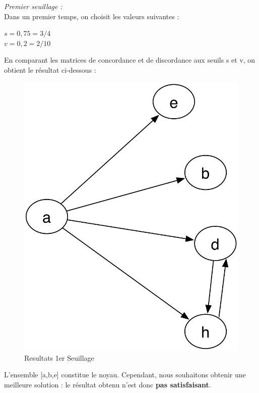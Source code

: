 \documentclass[a4paper, 11pt]{article}
\begin{document}
\emph{Premier seuillage :}\\
Dans un premier temps, on choisit les valeurs suivantes : 
\begin{center}
\textbf{$s = 0,75 = 3/4$\\
$v= 0,2 = 2/10$}
\end{center}
En comparant les matrices de concordance et de discordance aux seuils s et v, on obtient le résultat ci-dessous :\\
\begin{figure}[H]
   \begin{center}
        \includegraphics[scale=0.30]{../CR/src/Mimi/2eme.png}
        \caption{
           \label{fig} Resultats 1er Seuillage
        }
    \end{center}
\end{figure}
L’ensemble [a,b,e] constitue le noyau. Cependant, nous souhaitons obtenir une meilleure solution : le résultat obtenu n’est donc \textbf{pas satisfaisant}.\\\\
\end{document}
